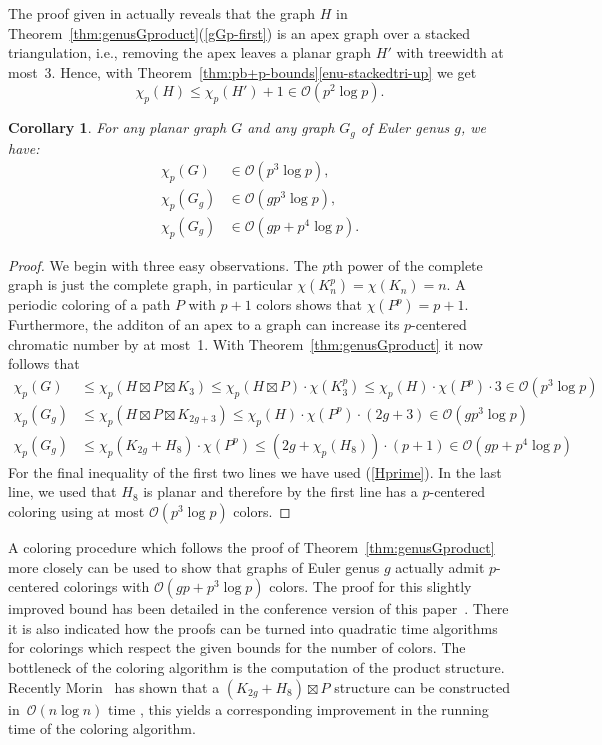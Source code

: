 \documentclass[11pt]{article}
\newtheorem{corollary}[theorem]{Corollary}
\begin{document}
The proof given in  \cite{DJMMUW-queues} actually reveals that
the graph $H$ in Theorem~\ref{thm:genusGproduct}(\ref{gGp-first})
is an apex graph over a stacked triangulation, i.e., removing the apex 
leaves a planar graph $H'$ with treewidth at most~3. Hence, with
Theorem~\ref{thm:pb+p-bounds}\ref{enu-stackedtri-up} we get
\begin{equation}
\chi_p(H) \leq \chi_p(H')+1 \in  \mathcal{O}(p^2 \log p). \tag{$*$}\label{Hprime}
\end{equation}

\begin{corollary}\label{cor:p+g}
For any planar graph $G$ and any graph $G_g$ of Euler genus $g$, we have:
\begin{align*}
\chi_p(G)&\in \mathcal{O}(p^3 \log p),\\
\chi_p(G_g)&\in \mathcal{O}(g p^3\log p),\\
\chi_p(G_g)&\in \mathcal{O}(gp + p^4\log p).
\end{align*}
\end{corollary}
\begin{proof}
  We begin with three easy observations.
  The $p$th power of the complete graph is just the complete graph, in
  particular $\chi(K_n^p)=\chi(K_n)=n$. A periodic coloring of a path $P$ with
  $p+1$ colors shows that $\chi(P^p)=p+1$. Furthermore, the additon of an apex
  to a graph can increase its $p$-centered chromatic number by at most~1. With
  Theorem~\ref{thm:genusGproduct} it now follows that
\begin{align*}
\chi_p(G)&\leq \chi_p(H\boxtimes P \boxtimes K_3)\leq \chi_p(H\boxtimes P) \cdot \chi(K_3^p)\leq \chi_p(H) \cdot \chi(P^p)\cdot 3 \in \mathcal{O}(p^3 \log p)\\
\chi_p(G_g)&\leq \chi_p(H\boxtimes P \boxtimes K_{2g+3})\leq \chi_p(H) \cdot \chi(P^p)\cdot (2g+3) \in \mathcal{O}(g p^3\log p)\\
\chi_p(G_g)&\leq \chi_p(K_{2g}+H_8) \cdot \chi(P^p)\leq (2g+\chi_p(H_8))\cdot (p+1)\in \mathcal{O}(gp + p^4\log p)
\end{align*}
For the final inequality of the first two lines we have used (\ref{Hprime}).
In the last line, we used that $H_8$ is planar and therefore by the first
line has a $p$-centered coloring using at most $\mathcal{O}(p^3\log p)$ colors.
\end{proof}

A coloring procedure which follows the proof of
Theorem~\ref{thm:genusGproduct} more closely can be used to show that graphs
of Euler genus $g$ actually admit $p$-centered colorings with
$\mathcal{O}(gp+p^3\log p)$ colors.  The proof for this slightly improved bound has
been detailed in the conference version of this paper~\cite{DFMS20}.  There it
is also indicated how the proofs can be turned into quadratic time algorithms
for colorings which respect the given bounds for the number of colors. The
bottleneck of the coloring algorithm is the computation of the product
structure.  Recently Morin~\cite{Morin21} has shown that a
$(K_{2g}+H_8)\boxtimes P$ structure can be constructed in~$\mathcal{O}(n\log n)$
time , this yields a corresponding improvement in the running time of the coloring
algorithm.
\end{document}
